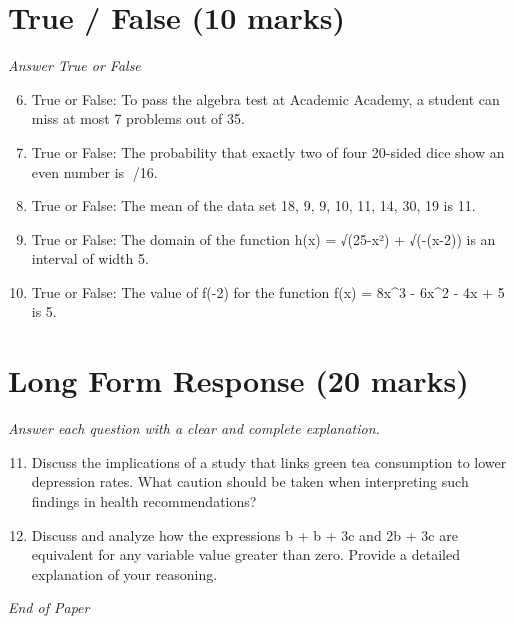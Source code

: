 \documentclass[12pt]{article}
\begin{document}
\section*{True / False (10 marks)}
\textit{Answer True or False}
\begin{enumerate}[label=\arabic*.]
\setcounter{enumi}{5}
\item True or False: To pass the algebra test at Academic Academy, a student can miss at most 7 problems out of 35.
\item True or False: The probability that exactly two of four 20-sided dice show an even number is /16.
\item True or False: The mean of the data set 18, 9, 9, 10, 11, 14, 30, 19 is 11.
\item True or False: The domain of the function h(x) = √(25-x²) + √(-(x-2)) is an interval of width 5.
\item True or False: The value of f(-2) for the function f(x) = 8x\^{}3 - 6x\^{}2 - 4x + 5 is 5.
\end{enumerate}

\section*{Long Form Response (20 marks)}
\textit{Answer each question with a clear and complete explanation.}
\begin{enumerate}[label=\arabic*.]
\setcounter{enumi}{10}
\item Discuss the implications of a study that links green tea consumption to lower depression
rates. What caution should be taken when interpreting such findings in health
recommendations?
\item Discuss and analyze how the expressions b + b + 3c and 2b + 3c are equivalent for any
variable value greater than zero. Provide a detailed explanation of your reasoning.
\end{enumerate}

\vfill
\noindent\textit{End of Paper}
\end{document}
